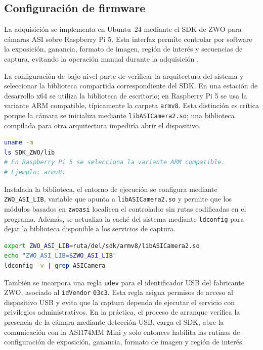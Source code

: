 \subsection{Configuración de firmware}

La adquisición se implementa en Ubuntu~24 mediante el SDK de ZWO para cámaras
ASI sobre Raspberry Pi 5. Esta interfaz permite controlar por software la
exposición, ganancia, formato de imagen, región de interés y secuencias de
captura, evitando la operación manual durante la adquisición
\cite{zwoASILinuxManual,raspberryPi5Docs2026}.

La configuración de bajo nivel parte de verificar la arquitectura del sistema y
seleccionar la biblioteca compartida correspondiente del SDK. En una estación de
desarrollo x64 se utiliza la biblioteca de escritorio; en Raspberry Pi 5 se usa
la variante ARM compatible, típicamente la carpeta \texttt{armv8}. Esta distinción
es crítica porque la cámara se inicializa mediante \texttt{libASICamera2.so}; una
biblioteca compilada para otra arquitectura impediría abrir el dispositivo.

\begin{lstlisting}[language=bash,basicstyle=\footnotesize\ttfamily,breaklines=true,caption={Verificación de arquitectura y selección de biblioteca del SDK de ZWO.},label={lst:zwo-arquitectura}]
uname -m
ls SDK_ZWO/lib
# En Raspberry Pi 5 se selecciona la variante ARM compatible.
# Ejemplo: armv8.
\end{lstlisting}

Instalada la biblioteca, el entorno de ejecución se configura mediante
\texttt{ZWO\_ASI\_LIB}, variable que apunta a \texttt{libASICamera2.so} y permite
que los módulos basados en \texttt{zwoasi} localicen el controlador sin rutas
codificadas en el programa. Además, se actualiza la caché del sistema mediante
\texttt{ldconfig} para dejar la biblioteca disponible a los servicios de captura.

\begin{lstlisting}[language=bash,basicstyle=\footnotesize\ttfamily,breaklines=true,caption={Configuración de la biblioteca compartida del SDK de ZWO.},label={lst:zwo-biblioteca}]
export ZWO_ASI_LIB=ruta/del/sdk/armv8/libASICamera2.so
echo "ZWO_ASI_LIB=$ZWO_ASI_LIB"
ldconfig -v | grep ASICamera
\end{lstlisting}

También se incorpora una regla \texttt{udev} para el identificador USB del
fabricante ZWO, asociado al \texttt{idVendor} \texttt{03c3}. Esta regla asigna
permisos de acceso al dispositivo USB y evita que la captura dependa de ejecutar
el servicio con privilegios administrativos. En la práctica, el proceso de
arranque verifica la presencia de la cámara mediante detección USB, carga el SDK,
abre la comunicación con la ASI174MM Mini y solo entonces habilita las rutinas de
configuración de exposición, ganancia, formato de imagen y región de interés.

